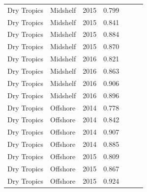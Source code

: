 \begin{longtable}{llccccc}
  Dry Tropics & Midshelf & 2015 & 0.799 & \cellcolor[HTML]{B0D235}{B} & \cellcolor[HTML]{B0D235}{B} & \cellcolor[HTML]{B0D235}{B} \\ 
  Dry Tropics & Midshelf & 2015 & 0.841 & \cellcolor[HTML]{00734D}{A} & \cellcolor[HTML]{00734D}{A} & \cellcolor[HTML]{B0D235}{B} \\ 
  Dry Tropics & Midshelf & 2015 & 0.884 & \cellcolor[HTML]{00734D}{A} & \cellcolor[HTML]{00734D}{A} & \cellcolor[HTML]{00734D}{A} \\ 
  Dry Tropics & Midshelf & 2015 & 0.870 & \cellcolor[HTML]{00734D}{A} & \cellcolor[HTML]{00734D}{A} & \cellcolor[HTML]{00734D}{A} \\ 
  Dry Tropics & Midshelf & 2016 & 0.821 & \cellcolor[HTML]{B0D235}{B} & \cellcolor[HTML]{00734D}{A} & \cellcolor[HTML]{B0D235}{B} \\ 
  Dry Tropics & Midshelf & 2016 & 0.863 & \cellcolor[HTML]{00734D}{A} & \cellcolor[HTML]{00734D}{A} & \cellcolor[HTML]{00734D}{A} \\ 
  Dry Tropics & Midshelf & 2016 & 0.906 & \cellcolor[HTML]{00734D}{A} & \cellcolor[HTML]{00734D}{A} & \cellcolor[HTML]{00734D}{A} \\ 
  Dry Tropics & Midshelf & 2016 & 0.896 & \cellcolor[HTML]{00734D}{A} & \cellcolor[HTML]{00734D}{A} & \cellcolor[HTML]{00734D}{A} \\ 
  Dry Tropics & Offshore & 2014 & 0.778 & \cellcolor[HTML]{B0D235}{B} & \cellcolor[HTML]{B0D235}{B} & \cellcolor[HTML]{B0D235}{B} \\ 
  Dry Tropics & Offshore & 2014 & 0.842 & \cellcolor[HTML]{00734D}{A} & \cellcolor[HTML]{00734D}{A} & \cellcolor[HTML]{B0D235}{B} \\ 
  Dry Tropics & Offshore & 2014 & 0.907 & \cellcolor[HTML]{00734D}{A} & \cellcolor[HTML]{00734D}{A} & \cellcolor[HTML]{00734D}{A} \\ 
  Dry Tropics & Offshore & 2014 & 0.885 & \cellcolor[HTML]{00734D}{A} & \cellcolor[HTML]{00734D}{A} & \cellcolor[HTML]{00734D}{A} \\ 
  Dry Tropics & Offshore & 2015 & 0.809 & \cellcolor[HTML]{B0D235}{B} & \cellcolor[HTML]{00734D}{A} & \cellcolor[HTML]{B0D235}{B} \\ 
  Dry Tropics & Offshore & 2015 & 0.867 & \cellcolor[HTML]{00734D}{A} & \cellcolor[HTML]{00734D}{A} & \cellcolor[HTML]{00734D}{A} \\ 
  Dry Tropics & Offshore & 2015 & 0.924 & \cellcolor[HTML]{00734D}{A} & \cellcolor[HTML]{00734D}{A} & \cellcolor[HTML]{00734D}{A} \\ 

\end{longtable}
